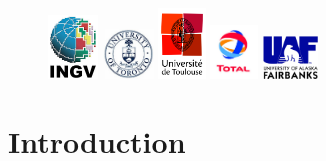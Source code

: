 \documentclass[oneside,english,onecolumn,letterpaper]{book}
\begin{document}
\begin{figure}[htbp]
\noindent \begin{centering}
\includegraphics[width=0.119\textwidth]{figures/logo_INGV}\vspace*{2truemm}
\includegraphics[width=0.119\textwidth]{figures/logo_University_of_Toronto}\vspace*{2truemm}
\includegraphics[width=0.112\textwidth]{figures/logo_Univ_Toulouse}\vspace*{2truemm}
\includegraphics[width=0.112\textwidth]{figures/logo_TOTAL}\vspace*{2truemm}
\includegraphics[width=0.130\textwidth]{figures/logo_Fairbanks}
\par\end{centering}
\end{figure}

\newpage{}

\tableofcontents{}


\chapter{Introduction}

\end{document}
